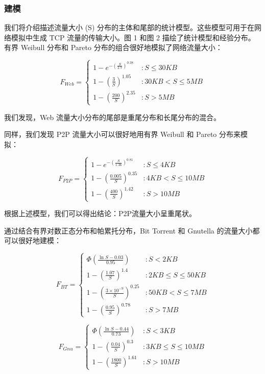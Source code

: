 \subsubsection{建模}

我们将介绍描述流量大小 (S) 分布的主体和尾部的统计模型。这些模型可用于在网络模拟中生成 TCP 流量的传输大小。图 1 和图 2 描绘了统计模型和经验分布。有界 Weibull 分布和 Pareto 分布的组合很好地模拟了网络流量大小：

\[F_{Web} = 
	\begin{cases} 
       1 - e^{-\left(\frac{S}{2.7}\right)^{0.38}} & : S \leq 30KB \\
       1 - \left(\frac{3}{S}\right)^{1.05} & : 30KB < S \leq 5MB \\
       1 - \left(\frac{200}{S}\right)^{2.35} & : S > 5MB
     \end{cases}
\]

我们发现，Web 流量大小分布的尾部是重尾分布和长尾分布的混合。

同样，我们发现 P2P 流量大小可以很好地用有界 Weibull 和 Pareto 分布来模拟：

\[F_{P2P} = \begin{cases} 
   1 - e^{-\left(\frac{S}{1.36}\right)^{0.81}} & : S \leq 4KB \\
   1 - \left(\frac{0.005}{S}\right)^{0.35} & : 4KB < S \leq 10MB \\
   1 - \left(\frac{400}{S}\right)^{1.42} & : S > 10MB
  \end{cases}\]

根据上述模型，我们可以得出结论：P2P流量大小呈重尾状。

通过结合有界对数正态分布和帕累托分布，Bit Torrent 和 Gnutella 的流量大小都可以很好地建模：

\[F_{BT} = \begin{cases} 
   \Phi \left(\frac{\ln S - 0.03}{0.95}\right) & : S < 2KB \\
   1 - \left(\frac{1.07}{S}\right)^{1.4} & : 2KB \leq S \leq 50KB \\
   1 - \left(\frac{3 \times 10^{-9}}{S}\right)^{0.25} & : 50KB < S \leq 7MB \\
   1 - \left(\frac{0.95}{S}\right)^{0.78} & : S > 7MB
  \end{cases}\]

\[F_{Gnu} = \begin{cases} 
   \Phi \left(\frac{\ln S - 0.44}{0.73}\right) & : S < 3KB \\
   1 - \left(\frac{0.04}{S}\right)^{0.3} & : 3KB \leq S \leq 10MB \\
   1 - \left(\frac{1800}{S}\right)^{1.61} & : S > 10MB
  \end{cases}\]

